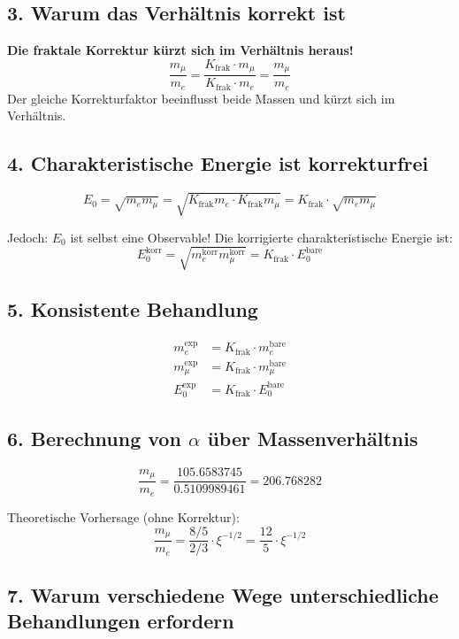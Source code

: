 \documentclass[12pt,a4paper]{article}
\theoremstyle{definition}
\begin{document}
\subsection{3. Warum das Verhältnis korrekt ist}

\begin{tcolorbox}[colback=green!5!white,colframe=green!75!black]
	\textbf{Die fraktale Korrektur kürzt sich im Verhältnis heraus!}
	\[
	\frac{m_\mu}{m_e} = \frac{K_{\text{frak}} \cdot m_\mu}{K_{\text{frak}} \cdot m_e} = \frac{m_\mu}{m_e}
	\]
	Der gleiche Korrekturfaktor beeinflusst beide Massen und kürzt sich im Verhältnis.
\end{tcolorbox}

\subsection{4. Charakteristische Energie ist korrekturfrei}

\[
E_0 = \sqrt{m_e m_\mu} = \sqrt{K_{\text{frak}} m_e \cdot K_{\text{frak}} m_\mu} = K_{\text{frak}} \cdot \sqrt{m_e m_\mu}
\]

Jedoch: $E_0$ ist selbst eine Observable! Die korrigierte charakteristische Energie ist:
\[
E_0^{\text{korr}} = \sqrt{m_e^{\text{korr}} m_\mu^{\text{korr}}} = K_{\text{frak}} \cdot E_0^{\text{bare}}
\]

\subsection{5. Konsistente Behandlung}

\begin{align*}
	m_e^{\text{exp}} &= K_{\text{frak}} \cdot m_e^{\text{bare}} \\
	m_\mu^{\text{exp}} &= K_{\text{frak}} \cdot m_\mu^{\text{bare}} \\
	E_0^{\text{exp}} &= K_{\text{frak}} \cdot E_0^{\text{bare}}
\end{align*}

\subsection{6. Berechnung von $\alpha$ über Massenverhältnis}

\[
\frac{m_\mu}{m_e} = \frac{105.6583745}{0.5109989461} = 206.768282
\]

Theoretische Vorhersage (ohne Korrektur):
\[
\frac{m_\mu}{m_e} = \frac{8/5}{2/3} \cdot \xi^{-1/2} = \frac{12}{5} \cdot \xi^{-1/2}
\]

\subsection{7. Warum verschiedene Wege unterschiedliche Behandlungen erfordern}
\end{document}

